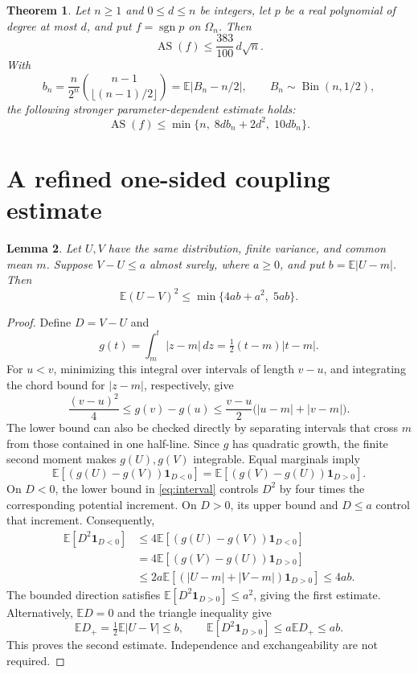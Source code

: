 \documentclass[11pt]{article}
\newtheorem{theorem}{Theorem}
\newtheorem{lemma}[theorem]{Lemma}
\theoremstyle{remark}
\newcommand{\E}{\mathbb E}
\newcommand{\AS}{\operatorname{AS}}
\newcommand{\sgn}{\operatorname{sgn}}
\newcommand{\ind}{\mathbf 1}
\begin{document}
\begin{theorem}\label{thm:main}
Let $n\ge1$ and $0\le d\le n$ be integers, let $p$ be a real polynomial
of degree at most $d$, and put $f=\sgn p$ on $\Omega_n$. Then
\begin{equation}\label{eq:main}
 \AS(f)\le\frac{383}{100}\,d\sqrt n.
\end{equation}
With
\begin{equation}\label{eq:bn}
 b_n=\frac{n}{2^n}\binom{n-1}{\lfloor(n-1)/2\rfloor}
     =\E|B_n-n/2|,\qquad B_n\sim\operatorname{Bin}(n,1/2),
\end{equation}
the following stronger parameter-dependent estimate holds:
\begin{equation}\label{eq:strong}
 \AS(f)\le\min\{n,\;8d b_n+2d^2,\;10d b_n\}.
\end{equation}
\end{theorem}

\section{A refined one-sided coupling estimate}
\begin{lemma}\label{lem:coupling}
Let $U,V$ have the same distribution, finite variance, and common mean $m$.
Suppose $V-U\le a$ almost surely, where $a\ge0$, and put
$b=\E|U-m|$. Then
\begin{equation}\label{eq:coupling}
 \E(U-V)^2\le\min\{4ab+a^2,\;5ab\}.
\end{equation}
\end{lemma}
\begin{proof}
Define $D=V-U$ and
\[
 g(t)=\int_m^t|z-m|\,dz=\tfrac12(t-m)|t-m|.
\]
For $u<v$, minimizing this integral over intervals of length $v-u$, and
integrating the chord bound for $|z-m|$, respectively, give
\begin{equation}\label{eq:interval}
 \frac{(v-u)^2}{4}\le g(v)-g(u)
 \le\frac{v-u}{2}\bigl(|u-m|+|v-m|\bigr).
\end{equation}
The lower bound can also be checked directly by separating intervals
that cross $m$ from those contained in one half-line.
Since $g$ has quadratic growth, the finite second moment makes
$g(U),g(V)$ integrable. Equal marginals imply
\[
 \E[(g(U)-g(V))\ind_{D<0}]
 =\E[(g(V)-g(U))\ind_{D>0}].
\]
On $D<0$, the lower bound in \eqref{eq:interval} controls $D^2$ by four
times the corresponding potential increment. On $D>0$, its upper bound
and $D\le a$ control that increment. Consequently,
\begin{align*}
 \E[D^2\ind_{D<0}]
 &\le4\E[(g(U)-g(V))\ind_{D<0}]\\
 &=4\E[(g(V)-g(U))\ind_{D>0}]\\
 &\le2a\E[(|U-m|+|V-m|)\ind_{D>0}]\le4ab.
\end{align*}
The bounded direction satisfies $\E[D^2\ind_{D>0}]\le a^2$, giving
the first estimate. Alternatively, $\E D=0$ and the triangle inequality
give
\[
 \E D_+=\tfrac12\E|U-V|\le b,
 \qquad
 \E[D^2\ind_{D>0}]\le a\E D_+\le ab.
\]
This proves the second estimate. Independence and exchangeability are
not required.
\end{proof}
\end{document}
